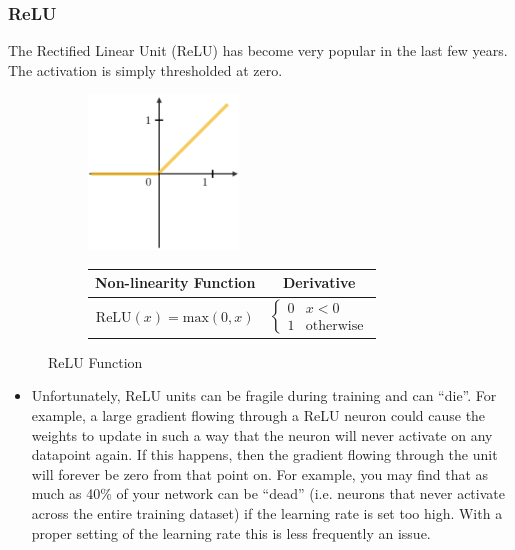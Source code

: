\documentclass[11pt]{article}
\numberwithin{equation}{section}
\theoremstyle{definition}%
\begin{document}
\subsubsection{ReLU}
The Rectified Linear Unit (ReLU) has become very popular in the last few years. The activation is simply thresholded at zero. 

\begin{figure}[h]
    \begin{center}
        \begin{subfigure}{0.35\textwidth}
            \includegraphics[width=4cm]{./Figs/relu.png}%
        \label{fig:relu_graph}
        \end{subfigure}
        \begin{subfigure}{0.35\textwidth}
            \begin{tabular}{||c c||} 
                \hline
                Non-linearity Function & Derivative \\ [0.5ex] 
                \hline
                $\text{ReLU}(x) = \text{max}(0, x)$ & $\begin{cases}
                    0 & x < 0 \\
                    1 & \text{otherwise}
                \end{cases}$ \\ [1ex] 
                \hline
            \end{tabular}
        \label{fig:relu_math}
        \end{subfigure}
    \end{center}
    \caption{ReLU Function}
    \label{fig:relu}
\end{figure}

\begin{itemize}
    \item {Unfortunately, ReLU units can be fragile during training and can “die”. For example, a large gradient flowing through a ReLU neuron could cause the weights to update in such a way that the neuron will never activate on any datapoint again. If this happens, then the gradient flowing through the unit will forever be zero from that point on. For example, you may find that as much as 40\% of your network can be “dead” (i.e. neurons that never activate across the entire training dataset) if the learning rate is set too high. With a proper setting of the learning rate this is less frequently an issue.}
\end{itemize}
\end{document}
